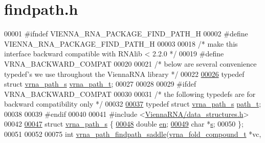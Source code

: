\hypertarget{findpath_8h_source}{}\section{findpath.\+h}
\label{findpath_8h_source}

\begin{DoxyCode}
00001 \textcolor{preprocessor}{#ifndef VIENNA\_RNA\_PACKAGE\_FIND\_PATH\_H}
00002 \textcolor{preprocessor}{#define VIENNA\_RNA\_PACKAGE\_FIND\_PATH\_H}
00003 
00018 \textcolor{comment}{/* make this interface backward compatible with RNAlib < 2.2.0 */}
00019 \textcolor{preprocessor}{#define VRNA\_BACKWARD\_COMPAT}
00020 
00021 \textcolor{comment}{/* below are several convenience typedef's we use throughout the ViennaRNA library */}
00022 
\hypertarget{findpath_8h_source.tex_l00026}{}\hyperlink{group__direct__paths_ga818d4f3d1cf8723d6905990b08d909fe}{00026} \textcolor{keyword}{typedef} \textcolor{keyword}{struct }\hyperlink{group__direct__paths_structvrna__path__s}{vrna\_path\_s}  \hyperlink{group__direct__paths_structvrna__path__s}{vrna\_path\_t};
00027 
00028 
00029 \textcolor{preprocessor}{#ifdef VRNA\_BACKWARD\_COMPAT}
00030 
00031 \textcolor{comment}{/* the following typedefs are for backward compatibility only */}
00032 
\hypertarget{findpath_8h_source.tex_l00037}{}\hyperlink{group__direct__paths_gab6b8737d5377e70a7815d04aae7fd884}{00037} \textcolor{keyword}{typedef} \textcolor{keyword}{struct }\hyperlink{group__direct__paths_structvrna__path__s}{vrna\_path\_s} \hyperlink{group__direct__paths_structvrna__path__s}{path\_t};
00038 
00039 \textcolor{preprocessor}{#endif}
00040 
00041 \textcolor{preprocessor}{#include <\hyperlink{data__structures_8h}{ViennaRNA/data\_structures.h}>}
00042 
\hypertarget{findpath_8h_source.tex_l00047}{}\hyperlink{group__direct__paths}{00047} \textcolor{keyword}{struct }\hyperlink{group__direct__paths_structvrna__path__s}{vrna\_path\_s} \{
\hypertarget{findpath_8h_source.tex_l00048}{}\hyperlink{group__direct__paths_ac25160bf31d28097358278f367e41227}{00048}   \textcolor{keywordtype}{double} \hyperlink{group__direct__paths_ac25160bf31d28097358278f367e41227}{en};  
\hypertarget{findpath_8h_source.tex_l00049}{}\hyperlink{group__direct__paths_a141b70a59cb81d10bc65bbb7a0f6db77}{00049}   \textcolor{keywordtype}{char} *\hyperlink{group__direct__paths_a141b70a59cb81d10bc65bbb7a0f6db77}{s};    
00050 \};
00051 
00052 
00075 \textcolor{keywordtype}{int} \hyperlink{group__direct__paths_ga957922acc1bcaa97f52cbd0975f7dcd0}{vrna\_path\_findpath\_saddle}(\hyperlink{group__fold__compound_structvrna__fc__s}{vrna\_fold\_compound\_t} *vc,

\end{DoxyCode}
